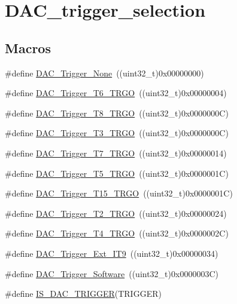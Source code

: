 \hypertarget{group___d_a_c__trigger__selection}{}\section{D\+A\+C\+\_\+trigger\+\_\+selection}
\label{group___d_a_c__trigger__selection}
\subsection*{Macros}
\begin{DoxyCompactItemize}
\item 
\#define \mbox{\hyperlink{group___d_a_c__trigger__selection_ga7849138e043267668d755390d923e4ba}{D\+A\+C\+\_\+\+Trigger\+\_\+\+None}}~((uint32\+\_\+t)0x00000000)
\item 
\#define \mbox{\hyperlink{group___d_a_c__trigger__selection_ga083307783678a2f1d3066db57dc84cfe}{D\+A\+C\+\_\+\+Trigger\+\_\+\+T6\+\_\+\+T\+R\+GO}}~((uint32\+\_\+t)0x00000004)
\item 
\#define \mbox{\hyperlink{group___d_a_c__trigger__selection_ga756700c6621eadb807e21a16966580a0}{D\+A\+C\+\_\+\+Trigger\+\_\+\+T8\+\_\+\+T\+R\+GO}}~((uint32\+\_\+t)0x0000000\+C)
\item 
\#define \mbox{\hyperlink{group___d_a_c__trigger__selection_ga82cbaedc35164c8b9fe0be2faec9b909}{D\+A\+C\+\_\+\+Trigger\+\_\+\+T3\+\_\+\+T\+R\+GO}}~((uint32\+\_\+t)0x0000000\+C)
\item 
\#define \mbox{\hyperlink{group___d_a_c__trigger__selection_ga9b92d497746be54af46ae4e9c1fc4a6f}{D\+A\+C\+\_\+\+Trigger\+\_\+\+T7\+\_\+\+T\+R\+GO}}~((uint32\+\_\+t)0x00000014)
\item 
\#define \mbox{\hyperlink{group___d_a_c__trigger__selection_ga35352cebfd1ae8a3d63e374a5d86a85d}{D\+A\+C\+\_\+\+Trigger\+\_\+\+T5\+\_\+\+T\+R\+GO}}~((uint32\+\_\+t)0x0000001\+C)
\item 
\#define \mbox{\hyperlink{group___d_a_c__trigger__selection_ga9f738c0c1366a588ac4fa9e060278c70}{D\+A\+C\+\_\+\+Trigger\+\_\+\+T15\+\_\+\+T\+R\+GO}}~((uint32\+\_\+t)0x0000001\+C)
\item 
\#define \mbox{\hyperlink{group___d_a_c__trigger__selection_ga3bfbff1e03af1fd17a57a43e57420fe6}{D\+A\+C\+\_\+\+Trigger\+\_\+\+T2\+\_\+\+T\+R\+GO}}~((uint32\+\_\+t)0x00000024)
\item 
\#define \mbox{\hyperlink{group___d_a_c__trigger__selection_ga58ccb2de3d22d66ee975152f5edb330a}{D\+A\+C\+\_\+\+Trigger\+\_\+\+T4\+\_\+\+T\+R\+GO}}~((uint32\+\_\+t)0x0000002\+C)
\item 
\#define \mbox{\hyperlink{group___d_a_c__trigger__selection_ga67c15b2c26246a2304f9db28e25adcc4}{D\+A\+C\+\_\+\+Trigger\+\_\+\+Ext\+\_\+\+I\+T9}}~((uint32\+\_\+t)0x00000034)
\item 
\#define \mbox{\hyperlink{group___d_a_c__trigger__selection_gadef77bb8bbd109232900902402ef637f}{D\+A\+C\+\_\+\+Trigger\+\_\+\+Software}}~((uint32\+\_\+t)0x0000003\+C)
\item 
\#define \mbox{\hyperlink{group___d_a_c__trigger__selection_ga4409b79639e6ae3b1f0ed61a33c810a3}{I\+S\+\_\+\+D\+A\+C\+\_\+\+T\+R\+I\+G\+G\+ER}}(T\+R\+I\+G\+G\+ER)
\end{DoxyCompactItemize}


